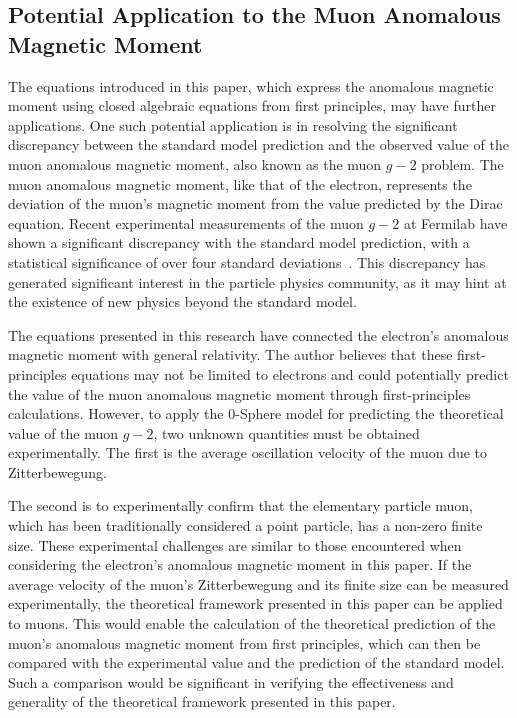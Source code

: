 \documentclass[%
 reprint,
 amsmath,amssymb,
 aps,
]{revtex4-1}
\numberwithin{equation}{section}%
\begin{document}
\subsection{\label{sec:Potential Application to}Potential Application to the Muon Anomalous Magnetic Moment}
The equations introduced in this paper, which express the anomalous magnetic moment using closed algebraic equations from first principles, may have further applications. One such potential application is in resolving the significant discrepancy between the standard model prediction and the observed value of the muon anomalous magnetic moment, also known as the muon $g-2$ problem.
The muon anomalous magnetic moment, like that of the electron, represents the deviation of the muon's magnetic moment from the value predicted by the Dirac equation. Recent experimental measurements of the muon $g-2$ at Fermilab have shown a significant discrepancy with the standard model prediction, with a statistical significance of over four standard deviations~\cite{muon_g-2_2021}. This discrepancy has generated significant interest in the particle physics community, as it may hint at the existence of new physics beyond the standard model.

The equations presented in this research have connected the electron's anomalous magnetic moment with general relativity. The author believes that these first-principles equations may not be limited to electrons and could potentially predict the value of the muon anomalous magnetic moment through first-principles calculations. However, to apply the 0-Sphere model for predicting the theoretical value of the muon $g-2$, two unknown quantities must be obtained experimentally. The first is the average oscillation velocity of the muon due to Zitterbewegung.

The second is to experimentally confirm that the elementary particle muon, which has been traditionally considered a point particle, has a non-zero finite size. These experimental challenges are similar to those encountered when considering the electron's anomalous magnetic moment in this paper.
If the average velocity of the muon's Zitterbewegung and its finite size can be measured experimentally, the theoretical framework presented in this paper can be applied to muons. This would enable the calculation of the theoretical prediction of the muon's anomalous magnetic moment from first principles, which can then be compared with the experimental value and the prediction of the standard model. Such a comparison would be significant in verifying the effectiveness and generality of the theoretical framework presented in this paper.
\end{document}
